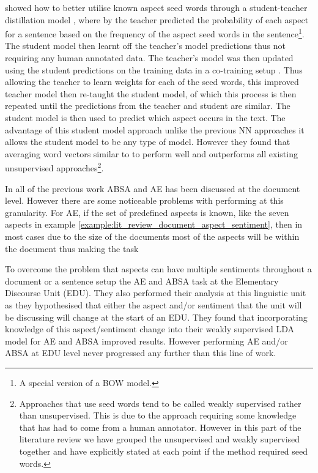 \citet{karamanolakis-etal-2019-leveraging} showed how to better utilise known aspect seed words through a student-teacher distillation model \citep{bucilua2006model, hinton2015distilling}, where by the teacher predicted the probability of each aspect for a sentence based on the frequency of the aspect seed words in the sentence\footnote{A special version of a BOW model.}. The student model then learnt off the teacher's model predictions thus not requiring any human annotated data. The teacher's model was then updated using the student predictions on the training data in a co-training setup \citep{blum1998combining}. Thus allowing the teacher to learn weights for each of the seed words, this improved teacher model then re-taught the student model, of which this process is then repeated until the predictions from the teacher and student are similar. The student model is then used to predict which aspect occurs in the text. The advantage of this student model approach unlike the previous NN approaches \citep{he-etal-2017-unsupervised, angelidis-lapata-2018-summarizing} it allows the student model to be any type of model. However they found that averaging word vectors similar to \citet{he-etal-2017-unsupervised, angelidis-lapata-2018-summarizing} to perform well and outperforms all existing unsupervised approaches\footnote{Approaches that use seed words tend to be called weakly supervised rather than unsupervised. This is due to the approach requiring some knowledge that has had to come from a human annotator. However in this part of the literature review we have grouped the unsupervised and weakly supervised together and have explicitly stated at each point if the method required seed words.}.

In all of the previous work ABSA and AE has been discussed at the document level. However there are some noticeable problems with performing at this granularity. For AE, if the set of predefined aspects is known, like the seven aspects in example \ref{example:lit_review_document_aspect_sentiment}, then in most cases due to the size of the documents most of the aspects will be within the document thus making the task 

To overcome the problem that aspects can have multiple sentiments throughout a document or a sentence \citet{lazaridou-etal-2013-bayesian} setup the AE and ABSA task at the Elementary Discourse Unit (EDU). They also performed their analysis at this linguistic unit as they hypothesised that either the aspect and/or sentiment that the unit will be discussing will change at the start of an EDU. They found that incorporating knowledge of this aspect/sentiment change into their weakly supervised LDA model for AE and ABSA improved results. However performing AE and/or ABSA at EDU level never progressed any further than this line of work.


